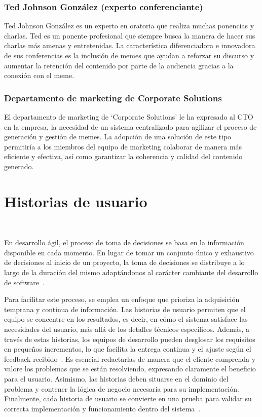     \subsubsection{Ted Johnson González (experto conferenciante)}

    Ted Johnson González es un experto en oratoria que realiza muchas ponencias y charlas. Ted es un ponente profesional que siempre busca la manera de hacer sus charlas más amenas y entretenidas. La característica diferenciadora e innovadora de sus conferencias es la inclusión de memes que ayudan a reforzar su discurso y aumentar la retención del contenido por parte de la audiencia gracias a la conexión con el meme.

    \subsubsection{Departamento de marketing de Corporate Solutions}

    El departamento de marketing de ‘Corporate Solutions’ le ha expresado al CTO en la empresa, la necesidad de un sistema centralizado para agilizar el proceso de generación y gestión de memes. La adopción de una solución de este tipo permitiría a los miembros del equipo de marketing colaborar de manera más eficiente y efectiva, así como garantizar la coherencia y calidad del contenido generado. 

\section{Historias de usuario}~\label{sec:historias_de_usuario}

    En desarrollo ágil, el proceso de toma de decisiones se basa en la información disponible en cada momento. En lugar de tomar un conjunto único y exhaustivo de decisiones al inicio de un proyecto, la toma de decisiones se distribuye a lo largo de la duración del mismo adaptándonos al carácter cambiante del desarrollo de software~\cite{cohn2004user}.

    Para facilitar este proceso, se emplea un enfoque que prioriza la adquisición temprana y continua de información. Las historias de usuario permiten que el equipo se concentre en los resultados, es decir, en cómo el sistema satisface las necesidades del usuario, más allá de los detalles técnicos específicos. Además, a través de estas historias, los equipos de desarrollo pueden desglosar los requisitos en pequeños incrementos, lo que facilita la entrega continua y el ajuste según el feedback recibido~\cite{schwaber2001agile}. Es esencial redactarlas de manera que el cliente comprenda y valore los problemas que se están resolviendo, expresando claramente el beneficio para el usuario. Asimismo, las historias deben situarse en el dominio del problema y contener la lógica de negocio necesaria para su implementación. Finalmente, cada historia de usuario se convierte en una prueba para validar su correcta implementación y funcionamiento dentro del sistema~\cite{rubin2012essential}.

